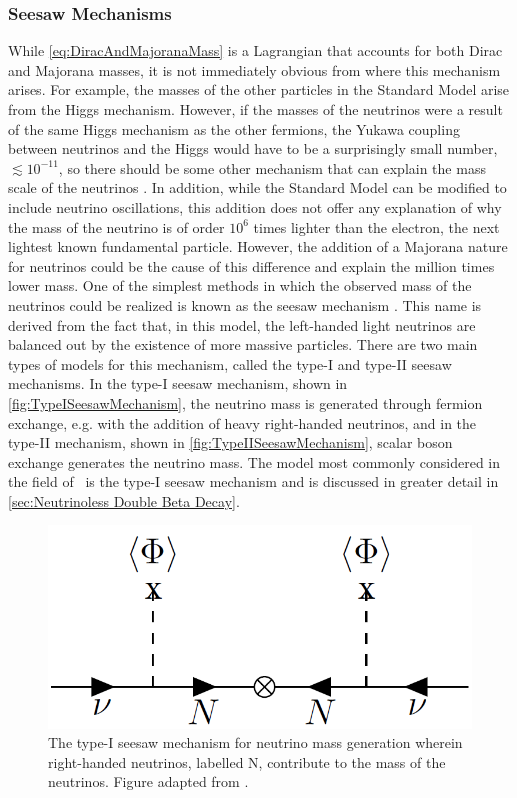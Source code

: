 \subsubsection{Seesaw Mechanisms}
\label{sssec:Seesaw Mechanism}
While \autoref{eq:DiracAndMajoranaMass} is a Lagrangian that accounts for both Dirac and Majorana masses, it is not immediately obvious from where this mechanism arises.
For example, the masses of the other particles in the Standard Model arise from the Higgs mechanism.
However, if the masses of the neutrinos were a result of the same Higgs mechanism as the other fermions, the Yukawa coupling between neutrinos and the Higgs would have to be a surprisingly small number, $\lesssim 10^{-11}$, so there should be some other mechanism that can explain the mass scale of the neutrinos \cite{Merle:2013gea}.
In addition, while the Standard Model can be modified to include neutrino oscillations, this addition does not offer any explanation of why the mass of the neutrino is of order $10^6$ times lighter than the electron, the next lightest known fundamental particle.
However, the addition of a Majorana nature for neutrinos could be the cause of this difference and explain the million times lower mass.
One of the simplest methods in which the observed mass of the neutrinos could be realized is known as the seesaw mechanism \cite{PhysRevD.22.2227}.
This name is derived from the fact that, in this model, the left-handed light neutrinos are balanced out by the existence of more massive particles.
There are two main types of models for this mechanism, called the type-I and type-II seesaw mechanisms.
In the type-I seesaw mechanism, shown in \autoref{fig:TypeISeesawMechanism}, the neutrino mass is generated through fermion exchange, e.g. with the addition of heavy right-handed neutrinos, and in the type-II mechanism, shown in \autoref{fig:TypeIISeesawMechanism}, scalar boson exchange generates the neutrino mass.
The model most commonly considered in the field of \zeronubb~is the type-I seesaw mechanism and is discussed in greater detail in \autoref{sec:Neutrinoless Double Beta Decay}.
\begin{figure}[tbph]
\centering
\includegraphics[width=0.40\linewidth]{Figures/TypeISeesaw.png}
\caption[Type-I seesaw mechanism]
{The type-I seesaw mechanism for neutrino mass generation wherein right-handed neutrinos, labelled $\textrm{N}$, contribute to the mass of the neutrinos.
Figure adapted from \cite{MIRANDA2016436}.}
\label{fig:TypeISeesawMechanism}
\end{figure}
